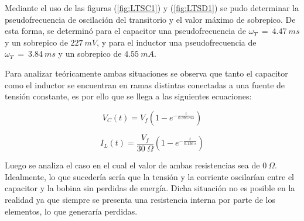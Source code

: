 \documentclass[a4paper]{article}
\begin{document}
Mediante el uso de las figuras (\ref{fig:LTSC1}) y (\ref{fig:LTSD1}) se pudo determinar la pseudofrecuencia de oscilación del transitorio y el valor máximo de sobrepico. De esta forma, se determinó para el capacitor una pseudofrecuencia de ${\omega}_{T} \ = \ 4.47 \ ms$ y un sobrepico de $227 \ mV$, y para el inductor una pseudofrecuencia de ${\omega}_{T} \ = \ 3.84 \ ms$ y un sobrepico de $4.55 \ mA$.

Para analizar teóricamente ambas situaciones se observa que tanto el capacitor como el inductor se encuentran en ramas distintas conectadas a una fuente de tensión constante, es por ello que se llega a las siguientes ecuaciones:

\begin{equation}
	V_{C} (t) = V_{f} \left( 1 - e^{- \frac{t}{0.396 \ ms}  } \right)
	\label{eq:carg-c}
\end{equation}

\begin{equation}
	I_{L} (t) = \frac{V_{f}}{30 \ \Omega} \left( 1 - e^{- \frac{t}{0.156 \ s}  } \right)
	\label{eq:carg-l}
\end{equation}

%
%
%

Luego se analiza el caso en el cual el valor de ambas resistencias sea de $0 \ \Omega$. Idealmente, lo que sucedería sería que la tensión y la corriente oscilarían entre el capacitor y la bobina sin perdidas de energía. Dicha situación no es posible en la realidad ya que siempre se presenta una resistencia interna por parte de los elementos, lo que generaría perdidas. 
\end{document}
